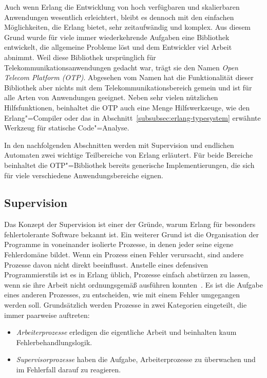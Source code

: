 Auch wenn Erlang die Entwicklung von hoch verfügbaren und skalierbaren Anwendungen wesentlich erleichtert, bleibt es dennoch mit den einfachen Möglichkeiten, die Erlang bietet, sehr zeitaufwändig und komplex. Aus diesem Grund wurde für viele immer wiederkehrende Aufgaben eine Bibliothek entwickelt, die allgemeine Probleme löst und dem Entwickler viel Arbeit abnimmt.  Weil diese Bibliothek ursprünglich für Telekommunikationsanwendungen gedacht war, trägt sie den Namen \textit{Open Telecom Platform (OTP)}. Abgesehen vom Namen hat die Funktionalität dieser Bibliothek aber nichts mit dem Telekommunikationsbereich gemein und ist für alle Arten von Anwendungen geeignet. Neben sehr vielen nützlichen Hilfsfunktionen, beinhaltet die OTP auch eine Menge Hilfswerkzeuge, wie \zB den Erlang"=Compiler oder das in Abschnitt~\ref{subsubsec:erlang-typesystem} erwähnte Werkzeug für statische Code"=Analyse.

In den nachfolgenden Abschnitten werden mit Supervision und endlichen Automaten zwei wichtige Teilbereiche von Erlang erläutert. Für beide Bereiche beinhaltet die OTP"=Bibliothek bereits generische Implementierungen, die sich für viele verschiedene Anwendungsbereiche eignen. 

\subsection{Supervision}
\label{subsec:erlang-supervision}

Das Konzept der Supervision ist einer der Gründe, warum 
Erlang für besonders fehlertolerante Software bekannt ist. Ein weiterer Grund ist die Organisation der Programme in voneinander isolierte Prozesse, in denen jeder seine eigene Fehlerdomäne bildet. Wenn ein Prozess einen Fehler verursacht, sind andere Prozesse davon nicht direkt beeinflusst. Anstelle eines defensiven Programmierstils ist es in Erlang üblich, Prozesse einfach abstürzen zu lassen, wenn sie ihre Arbeit nicht ordnungsgemäß ausführen konnten~\cite[104]{armstrong03}. Es ist die Aufgabe eines anderen Prozesses, zu entscheiden, wie mit einem Fehler umgegangen werden soll. Grundsätzlich werden Prozesse in zwei Kategorien eingeteilt, die immer paarweise auftreten:

\begin{itemize}
	\item \textit{Arbeiterprozesse} erledigen die eigentliche Arbeit und beinhalten kaum Fehlerbehandlungslogik.
	\item \textit{Supervisorprozesse} haben die Aufgabe, Arbeiterprozesse zu überwachen und im Fehlerfall darauf zu reagieren.
\end{itemize}

